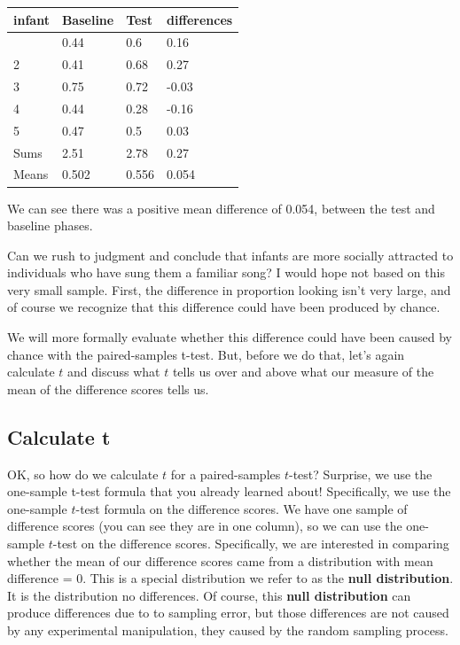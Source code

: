 \documentclass[
  letterpaper,
  DIV=11,
  numbers=noendperiod]{scrreprt}
\begin{document}
\begin{longtable}[]{@{}llll@{}}
\toprule\noalign{}
infant & Baseline & Test & differences \\
\midrule\noalign{}
\endhead
\bottomrule\noalign{}
\endlastfoot
1 & 0.44 & 0.6 & 0.16 \\
2 & 0.41 & 0.68 & 0.27 \\
3 & 0.75 & 0.72 & -0.03 \\
4 & 0.44 & 0.28 & -0.16 \\
5 & 0.47 & 0.5 & 0.03 \\
Sums & 2.51 & 2.78 & 0.27 \\
Means & 0.502 & 0.556 & 0.054 \\
\end{longtable}

We can see there was a positive mean difference of 0.054, between the
test and baseline phases.

Can we rush to judgment and conclude that infants are more socially
attracted to individuals who have sung them a familiar song? I would
hope not based on this very small sample. First, the difference in
proportion looking isn't very large, and of course we recognize that
this difference could have been produced by chance.

We will more formally evaluate whether this difference could have been
caused by chance with the paired-samples t-test. But, before we do that,
let's again calculate \(t\) and discuss what \(t\) tells us over and
above what our measure of the mean of the difference scores tells us.

\subsection{Calculate t}\label{calculate-t}

OK, so how do we calculate \(t\) for a paired-samples \(t\)-test?
Surprise, we use the one-sample t-test formula that you already learned
about! Specifically, we use the one-sample \(t\)-test formula on the
difference scores. We have one sample of difference scores (you can see
they are in one column), so we can use the one-sample \(t\)-test on the
difference scores. Specifically, we are interested in comparing whether
the mean of our difference scores came from a distribution with mean
difference = 0. This is a special distribution we refer to as the
\textbf{null distribution}. It is the distribution no differences. Of
course, this \textbf{null distribution} can produce differences due to
to sampling error, but those differences are not caused by any
experimental manipulation, they caused by the random sampling process.
\end{document}
